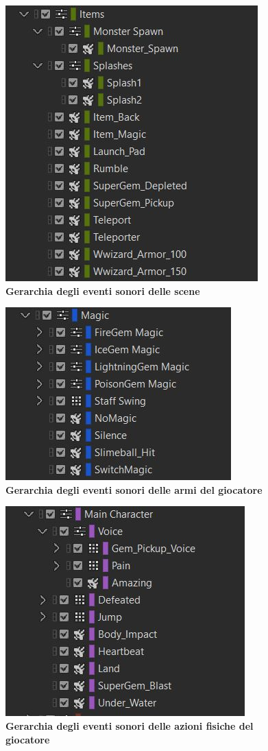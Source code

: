 	\begin{figure}[h]
		\begin{center}
			\includegraphics[width=.47\textwidth]{img/image3.jpg}
			\caption{\textbf{Gerarchia degli eventi sonori delle scene}}
			\label{gr01}
		\end{center}
	\end{figure}
	
	\begin{figure}[h]
		\begin{center}
			\includegraphics[width=.47\textwidth]{img/image4.jpg}
			\caption{\textbf{Gerarchia degli eventi sonori delle armi del giocatore}}
			\label{gr01}
		\end{center}
	\end{figure}

	\begin{figure}[h]
		\begin{center}
			\includegraphics[width=.47\textwidth]{img/image5.jpg}
			\caption{\textbf{Gerarchia degli eventi sonori delle azioni fisiche del giocatore}}
			\label{gr01}
		\end{center}
	\end{figure}
	
